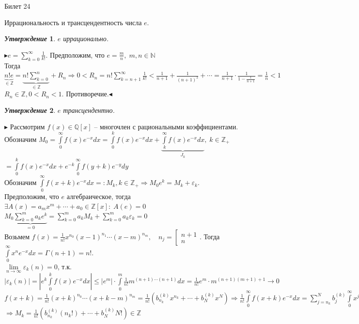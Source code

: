 \documentclass[a4paper,12pt]{article}
\newtheorem{utv}{\textit{Утверждение}}
\newcommand{\q}{\quad}
\newcommand{\pb}{\blacktriangleright}
\newcommand{\pe}{\blacktriangleleft}
\newcommand{\Ra}{\Rightarrow}
\newcommand{\bb}[1]{\mathbb{#1}}
\newcommand{\SL}{\sum\limits}
\newcommand{\IL}{\int\limits}
\begin{document}
\newpage
\begin{mybox2}{\hypertarget{bil24}{Билет 24}}

\begin{formbox}{}
Иррациональность и трансцендентность числа $e$.
\end{formbox}

\begin{formbox}{}
\begin{utv} $e$ иррационально.
\end{utv}
\end{formbox}
$\pb e = \SL_{k=0}^\infty \frac{1}{k!}$. Предположим, что $e = \frac{m}{n}, \; m,n\in\bb{N}$\\
Тогда $\underbrace{n!e}_{\in\bb{Z}} = \underbrace{n!\SL_{k=0}^n}_{\in\bb{Z}} + R_n\Ra 0 < R_n = n!\SL_{k=n+1}^\infty \frac{1}{k!} < \frac{1}{n+1} + \frac{1}{(n+1)^2} + \cdots = \frac{1}{n+1}\cdot \frac{1}{1-\frac{1}{n+1}} = \frac{1}{n} < 1 $ \\
$R_n\in\bb{Z}, 0 < R_n < 1$. Противоречие.$\pe$
\begin{formbox}{}
\begin{utv} $e$ трансцендентно.
\end{utv}
\end{formbox}
$\pb$ Рассмотрим $f(x)\in\bb{Q}[x]$ -- многочлен с рациональными коэффициентами.\\
Обозначим $M_0 = \IL_0^\infty f(x) e^{-x}dx = \IL_0^k f(x) e^{-x}dx + \underbrace{\IL_k^\infty f(x) e^{-x}dx}_{J_k}, \; k\in\bb{Z}_+$\\
$= \IL_0^k f(x)e^{-x}dx + e^{-k}\IL_0^\infty f(y+k)e^{-y}dy$\\
Обозначим $\IL_0^\infty f(x+k)e^{-x}dx =: M_k, k\in\bb{Z}_+\Ra M_0e^k = M_k+\varepsilon_k $.\\
Предположим, что $e$ алгебраическое, тогда $\exists A(x) = a_mx^m+\cdots+a_0\in\bb{Z}[x]:\; A(e) = 0$\\
$M_0 \underbrace{\SL_{k=0}^m a_ke^k}_{=0} = \SL_{k=0}^m a_kM_k+\SL_{k=0}^m a_k\varepsilon_k  = 0$\\
Возьмем $f(x) = \frac{1}{n!}x^{n_0}(x-1)^{n_1}\cdots(x-m)^{n_m},\q n_j = \left[\begin{gathered} n+1\\n\end{gathered} \right.$. Тогда $\IL_0^\infty x^ne^{-x}dx= \Gamma(n+1) = n! $.\\
$\lim\limits_{n\to\infty}\varepsilon_k(n) = 0$, т.к. $|\varepsilon_k(n)| = \left|e^k\IL_{0}^k f(x)e^{-x}dx \right|\le |e^m|\cdot\IL_{0}^m\frac{1}{n!}m^{(n+1)\cdots(n+1)}dx = \frac{1}{n!}e^m\cdot m^{(n+1)(m+1) + 1}\to0$\\
$f(x+k) = \frac{1}{n!}(x+k)^{n_0}\cdots(x+k-m)^{n_m}  =\frac{1}{n!}(b_{n_k}^{(k)} x^{n_k} + \cdots + b_N^{(k)}x^N) \Ra \frac{1}{n!}\IL_0^\infty f(x+k)e^{-x}dx = \SL_{j=n_k}^N b_j^{(k)}\IL_0^\infty x^j e^{-x}dx \Ra $\\
$\Ra M_k = \frac{1}{n!}(b_{n_k}^{(k)} (n_k!) + \cdots + b_N^{(k)}N!)\in\bb{Z}$
\end{mybox2}
\end{document}

